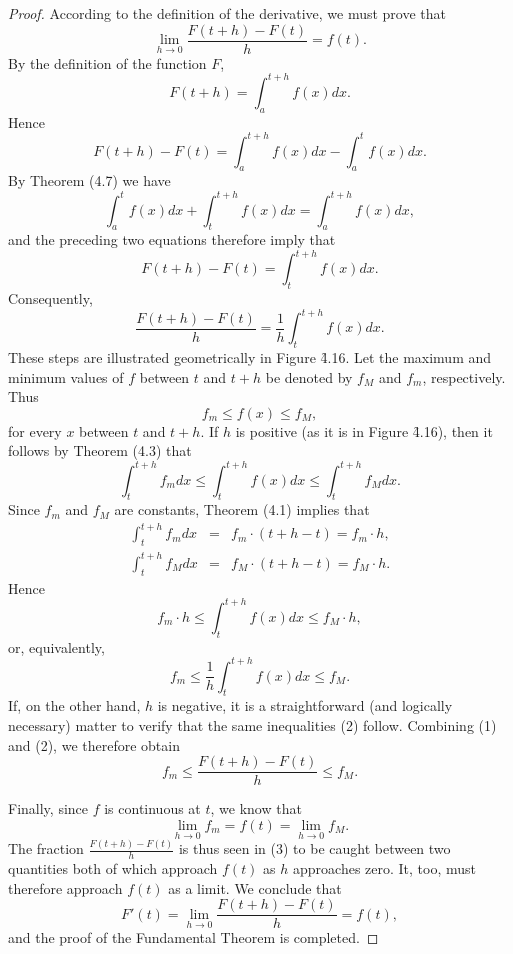 \begin{proof}
According to the definition of the derivative, we must prove that
$$
\lim_{h \rightarrow 0} \frac{F(t + h) - F(t)}{h} = f(t).
$$
By the definition of the function $F$,
$$
 F(t + h) = \int_{a}^{t + h}  f(x) dx.
$$
Hence
$$
F(t + h) - F(t) = \int_{a}^{t + h}  f(x) dx - \int_{a}^{t}  f(x) dx.
$$
By Theorem (4.7) we have 
$$
\int_{a}^{t} f(x) dx + \int_{t}^{t + h} f(x) dx = \int_{a}^{t + h} f(x) dx, 
$$
and the preceding two equations therefore imply that  
$$
F(t + h) - F(t) = \int_{t}^{t + h}  f(x) dx.
$$
Consequently,
\begin{equation}
\frac{F(t + h) - F(t)}{h} = \frac{1}{h} \int_{t}^{t + h}  f(x) dx.  
\label{eq4.5.1}
\end{equation}
These steps are illustrated geometrically in Figure \f{4.16}.
Let the maximum and minimum values of $f$ between $t$ and $t + h$ be denoted by $f_{M}$ and $f_{m}$, respectively. Thus
$$
f_{m} \leq f(x) \leq f_{M},
$$
for every $x$ between $t$ and $t + h$. If $h$ is positive (as it is in Figure \f{4.16}), then it follows by Theorem (4.3) that
$$
\int_{t}^{t + h}  f_{m} dx \leq \int_{t}^{t + h} f (x) dx \leq \int_{t}^{t + h} f_{M} dx.
$$
Since $f_{m}$ and $f_{M}$ are constants, Theorem (4.1) implies that 
\begin{eqnarray*}
\int_{t}^{t + h} f_{m} dx &=& f_{m} \cdot  (t + h - t) = f_{m} \cdot h,   \\
\int_{t}^{t + h} f_{M} dx &=&  f_{M} \cdot  (t + h - t) = f_{M} \cdot h.
\end{eqnarray*}
Hence
$$
 f_{m} \cdot h \leq  \int_{t}^{t + h} f(x) dx \leq f_{M} \cdot h,
$$
\noindent or, equivalently,
\begin{equation}
f_{m} \leq \frac{1}{h} \int_{t}^{t + h} f(x)dx \leq f_{M}. 
\label{eq4.5.2}
\end{equation}
If, on the other hand, $h$ is negative, it is a straightforward (and logically necessary) matter to verify that the same inequalities (2) follow. Combining (1) and (2), we therefore obtain
\begin{equation}
f_{m} \leq \frac{ F(t + h) - F(t)}{h} \leq  f_{M}.
\label{eq4.5.3}
\end{equation}

Finally, since $f$ is continuous at $t$, we know that 
$$
\lim_{h \rightarrow 0} f_{m} = f(t) = \lim_{h \rightarrow 0} f_{M}.
$$
The fraction $\frac{F(t + h) - F(t)}{h}$ is thus seen in (3) to be caught between two quantities both of which approach $f(t)$ as $h$ approaches zero. It, too, must therefore approach $f(t)$ as a limit. We conclude that
$$
F'(t) = \lim_{h \rightarrow 0} \frac{F(t + h) - F( t)}{h} = f(t),
$$
\noindent and the proof of the Fundamental Theorem is completed.
\end{proof}

